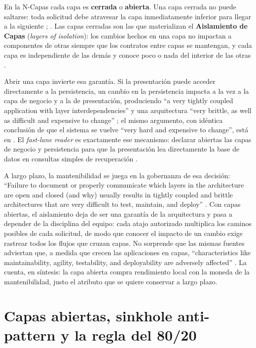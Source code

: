 En la N-Capas cada capa es \textbf{cerrada} o \textbf{abierta}. Una capa cerrada no puede
saltarse: toda solicitud debe atravesar la capa inmediatamente inferior para llegar a la
siguiente \parencite[3]{richards2015}; \parencite[cap.~10]{richardsford2020}. Las capas cerradas
son las que materializan el \textbf{Aislamiento de Capas} (\emph{layers of isolation}): los
cambios hechos en una capa no impactan a componentes de otras siempre que los contratos entre
capas se mantengan, y cada capa es independiente de las demás y conoce poco o nada del interior
de las otras \parencite[3-4]{richards2015}.

Abrir una capa invierte esa garantía. Si la presentación puede acceder directamente a la
persistencia, un cambio en la persistencia impacta a la vez a la capa de negocio y a la de
presentación, produciendo “a very tightly coupled application with layer interdependencies” y
una arquitectura “very brittle, as well as difficult and expensive to change”
\parencite[cap.~10]{richardsford2020}; el mismo argumento, con idéntica conclusión de que el
sistema se vuelve “very hard and expensive to change”, está en \textcite[4]{richards2015}. El
\emph{fast-lane reader} es exactamente ese mecanismo: declarar abiertas las capas de negocio y
persistencia para que la presentación lea directamente la base de datos en consultas simples de
recuperación \parencite[cap.~10]{richardsford2020}.

A largo plazo, la mantenibilidad se juega en la gobernanza de esa decisión: “Failure to document
or properly communicate which layers in the architecture are open and closed (and why) usually
results in tightly coupled and brittle architectures that are very difficult to test, maintain,
and deploy” \parencite[5]{richards2015}. Con capas abiertas, el aislamiento deja de ser una
garantía de la arquitectura y pasa a depender de la disciplina del equipo: cada atajo autorizado
multiplica los caminos posibles de cada solicitud, de modo que conocer el impacto de un cambio
exige rastrear todos los flujos que cruzan capas. No sorprende que las mismas fuentes adviertan
que, a medida que crecen las aplicaciones en capas, “characteristics like maintainability,
agility, testability, and deployability are adversely affected”
\parencite[cap.~10]{richardsford2020}. La cuenta, en síntesis: la capa abierta compra
rendimiento local con la moneda de la mantenibilidad, justo el atributo que se quiere conservar
a largo plazo.

\section{Capas abiertas, sinkhole anti-pattern y la regla del 80/20}
\label{sec:p6-sinkhole}

